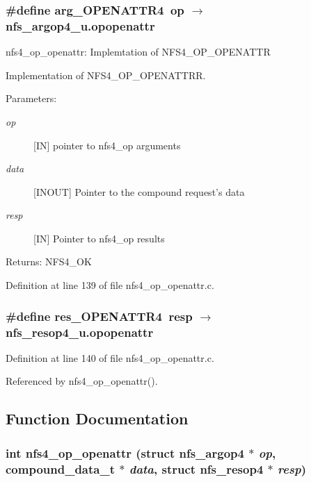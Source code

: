\subsubsection{\setlength{\rightskip}{0pt plus 5cm}\#define arg\_\-OPENATTR4\ op $\rightarrow$ nfs\_\-argop4\_\-u.opopenattr}\label{nfs4__op__openattr_8c_a0}


nfs4\_\-op\_\-openattr: Implemtation of NFS4\_\-OP\_\-OPENATTR

Implementation of NFS4\_\-OP\_\-OPENATTRR.

\begin{Desc}
\item[Parameters:]
\begin{description}
\item[{\em op}][IN] pointer to nfs4\_\-op arguments \item[{\em data}][INOUT] Pointer to the compound request's data \item[{\em resp}][IN] Pointer to nfs4\_\-op results\end{description}
\end{Desc}
\begin{Desc}
\item[Returns:]NFS4\_\-OK \end{Desc}


Definition at line 139 of file nfs4\_\-op\_\-openattr.c.
\subsubsection{\setlength{\rightskip}{0pt plus 5cm}\#define res\_\-OPENATTR4\ resp $\rightarrow$ nfs\_\-resop4\_\-u.opopenattr}\label{nfs4__op__openattr_8c_a1}




Definition at line 140 of file nfs4\_\-op\_\-openattr.c.

Referenced by nfs4\_\-op\_\-openattr().

\subsection{Function Documentation}
\subsubsection{\setlength{\rightskip}{0pt plus 5cm}int nfs4\_\-op\_\-openattr (struct nfs\_\-argop4 $\ast$ {\em op}, compound\_\-data\_\-t $\ast$ {\em data}, struct nfs\_\-resop4 $\ast$ {\em resp})}\label{nfs4__op__openattr_8c_a2}




